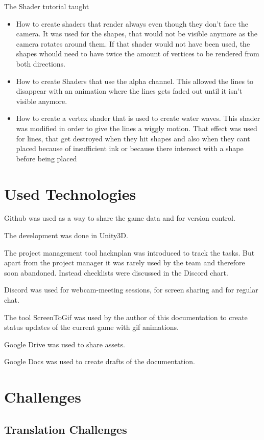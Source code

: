 The Shader tutorial taught
\begin{itemize}
	\item How to create shaders that render always even though they don’t face the camera. It was used for the shapes, that would not be visible anymore as the camera rotates around them. If that shader would not have been used, the shapes whould need to have twice the amount of vertices to be rendered from both directions.
	\item How to create Shaders that use the alpha channel. This allowed the lines to disappear with an animation where the lines gets faded out until it isn’t visible anymore.
	\item How to create a vertex shader that is used to create water waves. This shader was modified in order to give the lines a wiggly motion. That effect was used for lines, that get destroyed when they hit shapes and also when they cant placed because of insufficient ink or because there intersect with a shape before being placed
\end{itemize}

\section{Used Technologies}

Github was used as a way to share the game data and for version control.

The development was done in Unity3D.

The project management tool hacknplan was introduced to track the tasks. But apart from the project manager it was rarely used by the team and therefore soon abandoned.
Instead checklists were discussed in the Discord chart.

Discord was used for webcam-meeting sessions, for screen sharing and for regular chat.

The tool ScreenToGif was used by the author of this documentation to create status updates of the current game with gif animations.

Google Drive was used to share assets.

Google Docs was used to create drafts of the documentation.


\section{Challenges}

\subsection{Translation Challenges}

